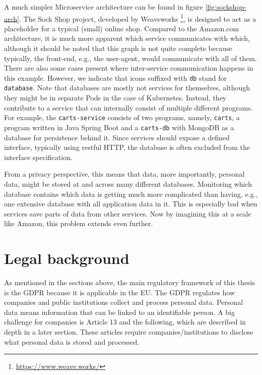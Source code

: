 A much simpler Microservice architecture can be found in figure \ref{fig:sockshop-arch}. The Sock Shop project, developed by Weaveworks \footnote{\url{https://www.weave.works/}}, is designed to act as a placeholder for a typical (small) online shop. 
Compared to the Amazon.com architecture, it is much more apparent which service communicates with which, although it should be noted that this graph is not quite complete because typically, the front-end, e.g., the user-agent, would communicate with all of them. There are also some cases present where inter-service communication happens in this example. However, we indicate that icons suffixed with \texttt{db} stand for \texttt{database}. Note that databases are mostly not services for themselves, although they might be in separate Pods in the case of Kubernetes. Instead, they contribute to a service that can internally consist of multiple different programs. For example, the \texttt{carts-service} consists of two programs, namely, \texttt{carts}, a program written in Java Spring Boot and a \texttt{carts-db} with MongoDB as a database for persistence behind it. Since services should expose a defined interface, typically using restful HTTP, the database is often excluded from the interface specification.


From a privacy perspective, this means that data, more importantly, personal data, might be stored at and across many different databases. Monitoring which database contains which data is getting much more complicated than having, e.g., one extensive database with all application data in it. This is especially bad when services save parts of data from other services. Now by imagining this at a scale like Amazon, this problem extends even further.

\section{Legal background}
As mentioned in the sections above, the main regulatory framework of this thesis is the GDPR because it is applicable in the EU.
The GDPR regulates how companies and public institutions collect and process personal data. Personal data means information that can be linked to an identifiable person. A big challenge for companies is Article 13 and the following, which are described in depth in a later section. These articles require companies/institutions to disclose what personal data is stored and processed. 

